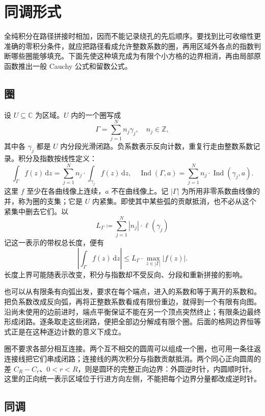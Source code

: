 \section{同调形式}
\label{b3:sec:1003}

全纯积分在路径拼接时相加，因而不能记录绕孔的先后顺序。要找到比可收缩性更准确的零积分条件，就应把路径看成允许整数系数的圈，再用区域外各点的指数判断哪些圈能够填充。下面先使这种填充成为有限个小方格的边界相消，再由局部原函数推出一般 Cauchy 公式和留数公式。

\subsection{圈}
\label{b3:subsec:100301}

设 \(U\subseteq\mathbb C\) 为区域。\(U\) 内的一个圈写成
\[
 \Gamma=\sum_{j=1}^N n_j\gamma_j,\quad n_j\in\mathbb Z,
\]
其中各 \(\gamma_j\) 都是 \(U\) 内分段光滑闭路。负系数表示反向计数，重复行走由整数系数记录。积分及指数按线性定义：
\[
 \int_\Gamma f(z)\,\mathrm dz
 =\sum_{j=1}^N n_j\cdot\int_{\gamma_j}f(z)\,\mathrm dz,
 \quad
 \operatorname{Ind}(\Gamma,a)
 =\sum_{j=1}^N n_j\cdot\operatorname{Ind}(\gamma_j,a).
\]
这里 \(f\) 至少在各曲线像上连续，\(a\) 不在曲线像上。记 \(|\Gamma|\) 为所用非零系数曲线像的并，称为圈的支集；它是 \(U\) 内紧集。即使其中某些弧的贡献抵消，也不必从这个紧集中删去它们。以
\[
 L_\Gamma\coloneqq\sum_{j=1}^N|n_j|\cdot\ell(\gamma_j)
\]
记这一表示的带权总长度，便有
\[
 \left|\int_\Gamma f(z)\,\mathrm dz\right|
 \le L_\Gamma\cdot\max_{z\in|\Gamma|}|f(z)|.
\]
长度上界可能随表示改变，积分与指数却不受反向、分段和重新拼接的影响。

\ProseParagraphBreak
也可以从有限条有向弧出发，要求在每个端点，进入的系数和等于离开的系数和。把负系数改成反向弧，再将正整数系数看成有限份重边，就得到一个有限有向图。沿尚未使用的边前进时，端点平衡保证不能在另一个顶点突然终止；有限条边最终形成闭路。逐条取走这些闭路，便把全部边分解成有限个圈。后面的格网边界恒等式正是在这种逐边计数的意义下成立。

\ProseParagraphBreak
圈不要求各部分相互连接。两个互不相交的圆周可以组成一个圈，也可用一条往返连接线把它们串成闭路；连接线的两次积分与指数贡献抵消。两个同心正向圆周的差 \(C_R-C_r\)、\(0<r<R\)，则是圆环的完整正向边界：外圆逆时针，内圆顺时针。这里的正向统一表示区域位于行进方向左侧，不能把每个边界分量都改成逆时针。

\subsection{同调}
\label{b3:subsec:100302}

